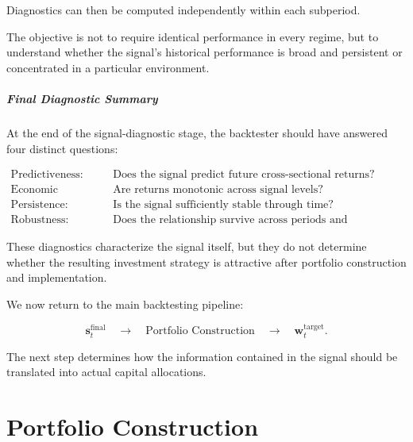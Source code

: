 \documentclass[11pt,a4paper]{article}
\begin{document}
Diagnostics can then be computed independently within each subperiod.

The objective is not to require identical performance in every regime, but to
understand whether the signal's historical performance is broad and persistent
or concentrated in a particular environment.


\subsubsection{Final Diagnostic Summary}

At the end of the signal-diagnostic stage, the backtester should have answered
four distinct questions:

\begin{equation}
\boxed{
\begin{aligned}
\text{Predictiveness:}
&\quad
\text{Does the signal predict future cross-sectional returns?}
\\
\text{Economic Shape:}
&\quad
\text{Are returns monotonic across signal levels?}
\\
\text{Persistence:}
&\quad
\text{Is the signal sufficiently stable through time?}
\\
\text{Robustness:}
&\quad
\text{Does the relationship survive across periods and subuniverses?}
\end{aligned}
}
\end{equation}

These diagnostics characterize the signal itself, but they do not determine
whether the resulting investment strategy is attractive after portfolio
construction and implementation.

We now return to the main backtesting pipeline:

\begin{equation}
\boxed{
\mathbf{s}_t^{\mathrm{final}}
\quad
\longrightarrow
\quad
\text{Portfolio Construction}
\quad
\longrightarrow
\quad
\mathbf{w}_t^{\mathrm{target}}.
}
\end{equation}

The next step determines how the information contained in the signal should be
translated into actual capital allocations.

\part{Portfolio Construction}
\end{document}

